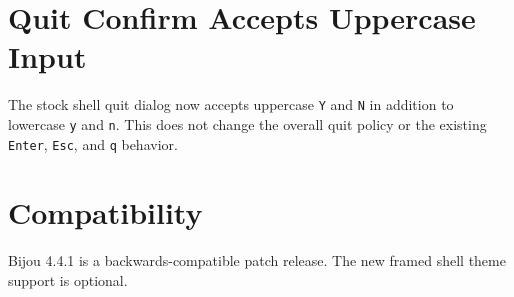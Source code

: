 \section{Quit Confirm Accepts Uppercase Input}\label{record-279-quit-confirm-accepts-uppercase-input}

The stock shell quit dialog now accepts uppercase \texttt{Y} and \texttt{N} in addition to lowercase \texttt{y} and \texttt{n}. This does not change the overall quit policy or the existing \texttt{E\allowbreak{}n\allowbreak{}t\allowbreak{}e\allowbreak{}r}, \texttt{E\allowbreak{}s\allowbreak{}c}, and \texttt{q} behavior.

\section{Compatibility}\label{record-279-compatibility}

Bijou 4.4.1 is a backwards-compatible patch release. The new framed shell theme support is optional.


